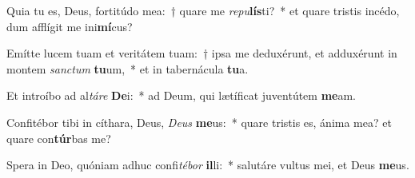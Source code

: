 \item Quia tu es, Deus, fortitúdo mea:~† quare me \textit{re}\textit{pu}\textbf{lís}ti?~* et quare tristis incédo, dum afflígit me ini\textbf{mí}cus?
\item Emítte lucem tuam et veritátem tuam:~† ipsa me deduxérunt, et adduxérunt in montem \textit{sanc}\textit{tum} \textbf{tu}um,~* et in tabernácula \textbf{tu}a.
\item Et introíbo ad al\textit{tá}\textit{re} \textbf{De}i:~* ad Deum, qui lætíficat juventútem \textbf{me}am.
\item Confitébor tibi in cíthara, Deus, \textit{De}\textit{us} \textbf{me}us:~* quare tristis es, ánima mea? et quare con\textbf{túr}bas me?
\item Spera in Deo, quóniam adhuc confi\textit{té}\textit{bor} \textbf{il}li:~* salutáre vultus mei, et Deus \textbf{me}us.
